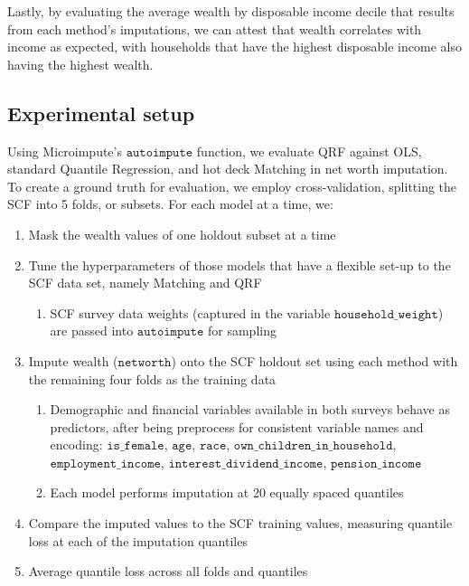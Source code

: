 Lastly, by evaluating the average wealth by disposable income decile that results from each method's imputations, we can attest that wealth correlates with income as expected, with households that have the highest disposable income also having the highest wealth. 

\subsection{Experimental setup}

Using Microimpute's $\texttt{autoimpute}$ function, we evaluate QRF against OLS, standard Quantile Regression, and hot deck Matching in net worth imputation. To create a ground truth for evaluation, we employ cross-validation, splitting the SCF into 5 folds, or subsets. For each model at a time, we:

\begin{enumerate}
    \item Mask the wealth values of one holdout subset at a time

    \item Tune the hyperparameters of those models that have a flexible set-up to the SCF data set, namely Matching and QRF
    \begin{enumerate}
        \item SCF survey data weights (captured in the variable $\texttt{household\_weight}$) are passed into $\texttt{autoimpute}$ for sampling
    \end{enumerate}

    \item Impute wealth ($\texttt{networth}$) onto the SCF holdout set using each method with the remaining four folds as the training data
    \begin{enumerate}
        \item Demographic and financial variables available in both surveys behave as predictors, after being preprocess for consistent variable names and encoding: $\texttt{is\_female}$, $\texttt{age}$, $\texttt{race}$, $\texttt{own\_children\_in\_household}$, $\texttt{employment\_income}$, $\texttt{interest\_dividend\_income}$, $\texttt{pension\_income}$ 
        \item Each model performs imputation at 20 equally spaced quantiles
    \end{enumerate}

    \item Compare the imputed values to the SCF training values, measuring quantile loss at each of the imputation quantiles 

    \item Average quantile loss across all folds and quantiles
\end{enumerate}

